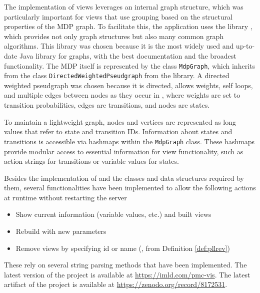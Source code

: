 \documentclass[preview]{standalone}
\begin{document}
The implementation of views leverages an internal graph structure, which was particularly important for views that use grouping based on the structural properties of the MDP graph. To facilitate this, the application uses the \jgrapht library \cite{Michail2020}, which provides not only graph structures but also many common graph algorithms. This library was chosen because it is the most widely used and up-to-date Java library for graphs, with the best documentation and the broadest functionality. The MDP itself is represented by the class \texttt{MdpGraph}, which inherits from the class \texttt{DirectedWeightedPseudgraph} from the \jgrapht library. A directed weighted pseudgraph was chosen because it is directed, allows weights, self loops, and multiple edges between nodes as they occur in \chgphsN, where weights are set to transition probabilities, edges are transitions, and nodes are states.

To maintain a lightweight graph, nodes and vertices are represented as long values that refer to state and transition IDs. Information about states and transitions is accessible via hashmaps within the \texttt{MdpGraph} class. These hashmaps provide modular access to essential information for view functionality, such as action strings for transitions or variable values for states.

Besides the implementation of \viewsN and the classes and data structures required by them, several functionalities have been implemented to allow the following actions at runtime without restarting the server
\begin{itemize}
	\item Show current \viewN information (variable values, etc.) and built views
	\item Rebuild \viewN with new parameters
	\item Remove views by specifying id or name (\pllrev, from Definition \ref{def:pllrev})	
\end{itemize}

These rely on several string parsing methods that have been implemented. The latest version of the project \pmcvis is available at \url{https://imld.com/pmc-vis}. The latest artifact of the project is available at \url{https://zenodo.org/record/8172531}.
\end{document}
